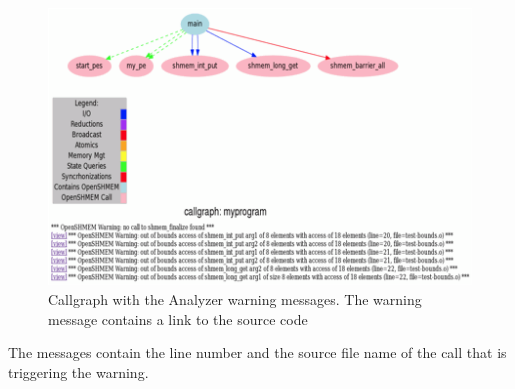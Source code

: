 \vspace{0.1in}

\begin{figure}[!h]
  \begin{center}
    \includegraphics[width=1.0\textwidth]{./image010}
    \caption{Callgraph with the \openshmem Analyzer warning messages.
      The warning message contains a link to the source code}
    \label{fig:warnings}
  \end{center}
\end{figure}

The messages contain the line number and the source file name of the
\openshmem call that is triggering the warning.


